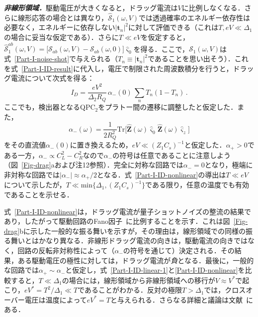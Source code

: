 \documentclass[a4paper,11pt]{ltjsarticle}
\def\Tr{\mathrm{Tr}}
\begin{document}
\textbf{\textit{非線形領域．}}駆動電圧が大きくなると，ドラッグ電流は$V$に比例しなくなる．さらに線形応答の場合とは異なり，$\hat{\mathcal{S}}_{1}(\omega,V)$では透過確率のエネルギー依存性は必要なく，エネルギーに依存しない$|\mathbf{t}_n|^2$に対して評価できる（これは$T,eV\ll \Delta_1$の場合に妥当な仮定である）．さらに$T\ll eV$を仮定すると，$\hat{\mathcal{S}}^{ab}_{1}(\omega,V)=
\big[\mathcal{S}_{ab}(\omega,V)-\mathcal{S}_{ab}(\omega,0)\big]\hat{\varsigma}_{0}$を得る．ここで，$\mathcal{S}_1(\omega,V)$は式~\eqref{Part-I-noise-shot}で与えられる（$T_{n}\equiv|\mathbf{t}_{n}|^{2}$であることを思い出そう）．これを式~\eqref{Part-I-ID-result}に代入し，電圧で制限された周波数積分を行うと，ドラッグ電流について次式を得る：
\begin{equation}\label{Part-I-ID-nonlinear}
I_{D}=\frac{eV^2}{\Delta_{2}R_{Q}}\,  \alpha_{-}(0) \,
\sum_{n}T_{n}(1-T_{n})\,.
\end{equation}
ここでも，検出器となるQPC$_2$をプラトー間の遷移に調整したと仮定した．また，$$\alpha_{-}(\omega)=\frac{1}{2R^{2}_{Q}}\Tr\big[
\hat{\mathbf{Z}}(\omega)\hat{\varsigma}_{0}
\hat{\mathbf{Z}}(\omega)\hat{\varsigma}_{z}\big]$$をその直流値$\alpha_{-}(0)$に置き換えるため，$eV\ll
(Z_1C_s)^{-1}$と仮定した．$\alpha_{+}>0$である一方，$\alpha_{-}\propto
C^{2}_{L}-C^{2}_{R}$なので$\alpha_{-}$の符号は任意であることに注意しよう（図~\ref{Fig-drag}aおよび注12参照）．完全に対称な回路では$\alpha_{-}=0$となり，極端に非対称な回路では$|\alpha_{-}|\approx \alpha_{+}/2$となる．式~\eqref{Part-I-ID-nonlinear}の導出は$T\ll eV$について示したが，$T\ll \mathrm{min}\{\Delta_1, (Z_1C_s)^{-1}\}$である限り，任意の温度でも有効であることを示せる．



式~\eqref{Part-I-ID-nonlinear}は，ドラッグ電流が量子ショットノイズの整流の結果であり，したがって駆動回路のFano因子~\cite{Lesovik}に比例することを示す．これは図~\ref{Fig-drag}bに示した一般的な振る舞いを示すが，その理由は，線形領域での同様の振る舞いとはかなり異なる．非線形ドラッグ電流の向きは，駆動電流の向きではなく，回路の反転非対称性によって（$\alpha_{-}$の符号を通じて）決定される．その結果，ある駆動電圧の極性に対しては，ドラッグ電流が{\em 負}となる．最後に，一般的な回路では$\alpha_+\sim \alpha_-$と仮定し，式~\eqref{Part-I-ID-linear-1}と\eqref{Part-I-ID-nonlinear}を比較すると，$T\ll \Delta_1$の場合には，線形領域から非線形領域への移行が$V\approx V^*$で起こり，$eV^*=T^2/\Delta_1\ll T$であることがわかる．反対の極限$T>\Delta_1$では，クロスオーバー電圧は温度によって$eV^*=T$と与えられる．さらなる詳細と議論は文献~\cite{LevchenkoKamenev-QPC}にある．
\end{document}

